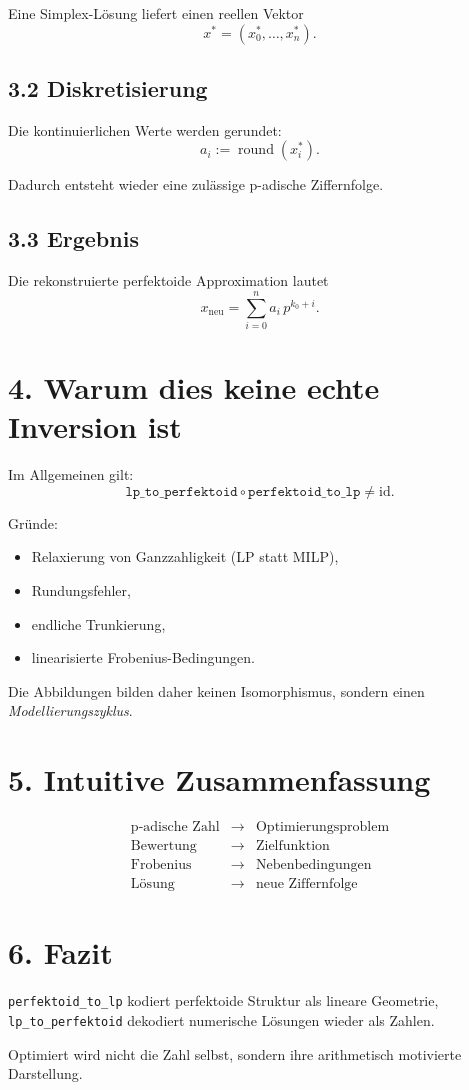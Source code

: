 \documentclass[11pt]{article}
\begin{document}
Eine Simplex-Lösung liefert einen reellen Vektor
\[
x^\ast = (x_0^\ast, \dots, x_n^\ast).
\]

\subsection*{3.2 Diskretisierung}

Die kontinuierlichen Werte werden gerundet:
\[
a_i := \operatorname{round}(x_i^\ast).
\]

Dadurch entsteht wieder eine zulässige p-adische Ziffernfolge.

\subsection*{3.3 Ergebnis}

Die rekonstruierte perfektoide Approximation lautet
\[
x_{\text{neu}} = \sum_{i=0}^{n} a_i \, p^{k_0 + i}.
\]

\section*{4. Warum dies keine echte Inversion ist}

Im Allgemeinen gilt:
\[
\texttt{lp\_to\_perfektoid} \circ \texttt{perfektoid\_to\_lp}
\neq \mathrm{id}.
\]

Gründe:
\begin{itemize}
\item Relaxierung von Ganzzahligkeit (LP statt MILP),
\item Rundungsfehler,
\item endliche Trunkierung,
\item linearisierte Frobenius-Bedingungen.
\end{itemize}

Die Abbildungen bilden daher keinen Isomorphismus, sondern einen
\emph{Modellierungszyklus}.

\section*{5. Intuitive Zusammenfassung}

\[
\begin{array}{ccl}
\text{p-adische Zahl} & \longrightarrow & \text{Optimierungsproblem} \\
\text{Bewertung}     & \longrightarrow & \text{Zielfunktion} \\
\text{Frobenius}     & \longrightarrow & \text{Nebenbedingungen} \\
\text{Lösung}        & \longrightarrow & \text{neue Ziffernfolge}
\end{array}
\]

\section*{6. Fazit}

\texttt{perfektoid\_to\_lp} kodiert perfektoide Struktur als lineare Geometrie,  
\texttt{lp\_to\_perfektoid} dekodiert numerische Lösungen wieder als Zahlen.

Optimiert wird nicht die Zahl selbst, sondern ihre
arithmetisch motivierte Darstellung.
\end{document}
